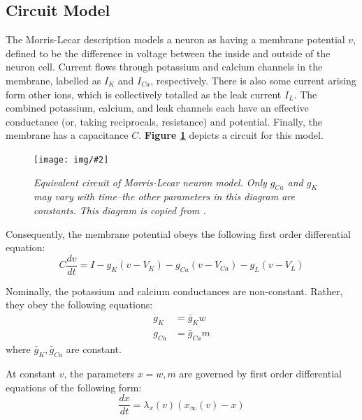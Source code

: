 \documentclass[letterpaper,12pt]{article}
\numberwithin{table}{section}
\numberwithin{figure}{section}
\numberwithin{equation}{section}
\newcommand*{\deriv}[2]{\frac{d #1}{d #2}}
\newcommand{\centerfig}[2]{\begin{center}\texttt{[image: img/\#2]}\end{center}}
\newcommand{\ccaption}[1]{\caption{\textit{#1}}}
\newcommand{\reffig}[1]{\textbf{Figure \ref{#1}}}
\begin{document}
\begin{flushleft}
    \subsection{Circuit Model}

    The Morris-Lecar description \cite{ml} models a neuron as having a membrane potential $v$, defined to be the difference in voltage between the inside and outside of the neuron cell. Current flows through potassium and calcium channels in the membrane, labelled as $I_K$ and $I_{Ca}$, respectively. There is also some current arising form other ions, which is collectively totalled as the leak current $I_L$. The combined potassium, calcium, and leak channels each have an effective conductance (or, taking reciprocals, resistance) and potential. Finally, the membrane has a capacitance $C$. \reffig{fig:ml-circuit} depicts a circuit for this model.

    \begin{figure}[h]

        \centering
    
        \centerfig{0.6}{ml-circuit.jpg}

        \captionsetup{width=0.8\linewidth}
        \ccaption{Equivalent circuit of Morris-Lecar neuron model. Only $g_{Ca}$ and $g_K$ may vary with time--the other parameters in this diagram are constants. This diagram is copied from \cite{ml}.}
        \label{fig:ml-circuit}
    
    \end{figure}

    Consequently, the membrane potential obeys the following first order differential equation:
    \begin{equation}
        C\deriv{v}{t} = I - g_K (v - V_K) - g_{Ca} (v - V_{Ca}) - g_L (v - V_L)
        \label{eqn:ml-circuit}
    \end{equation}

    Nominally, the potassium and calcium conductances are non-constant. Rather, they obey the following equations:
    \begin{align}
        g_K &= \bar{g}_K w \\
        g_{Ca} &= \bar{g}_{Ca} m
    \end{align}
    where $\bar{g}_K, \bar{g}_{Ca}$ are constant.
    
    At constant $v$, the parameters $x = w, m$ are governed by first order differential equations of the following form:
    \begin{equation}
        \label{eqn:ml-voltage-gating}
        \deriv{x}{t} = \lambda_x(v) (x_\infty(v) - x)
    \end{equation}
    

\end{flushleft}
\end{document}
